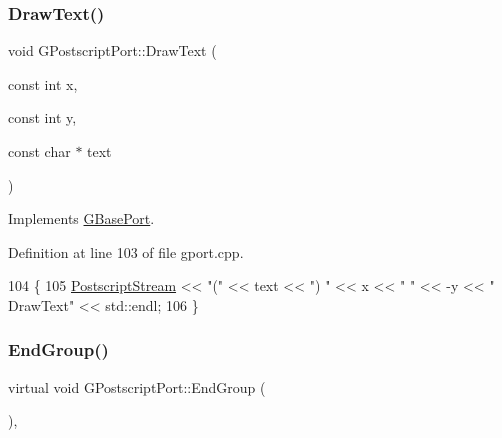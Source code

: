 \mbox{\label{class_g_postscript_port_abdd3978e13af04f5e6db9cf28cf861a8}} 
\subsubsection{\texorpdfstring{Draw\+Text()}{DrawText()}}
{\footnotesize\ttfamily void G\+Postscript\+Port\+::\+Draw\+Text (\begin{DoxyParamCaption}\item[{const int}]{x,  }\item[{const int}]{y,  }\item[{const char $\ast$}]{text }\end{DoxyParamCaption})\hspace{0.3cm}{\ttfamily [virtual]}}



Implements \mbox{\hyperlink{class_g_base_port_a9b947d2575b05f303520fbbe7fd9e350}{G\+Base\+Port}}.



Definition at line 103 of file gport.\+cpp.


\begin{DoxyCode}
104 \{
105     \mbox{\hyperlink{class_g_postscript_port_a0fb398f1c65b3ccb0efccd509f60d20d}{PostscriptStream}}  << \textcolor{stringliteral}{"("} << text << \textcolor{stringliteral}{") "} << x << \textcolor{stringliteral}{" "} << -y << \textcolor{stringliteral}{" DrawText"} << std::endl;
106 \}
\end{DoxyCode}
\mbox{\label{class_g_postscript_port_a1b78acf751c5a4c04f5942bb8bf4ed67}} 
\subsubsection{\texorpdfstring{End\+Group()}{EndGroup()}}
{\footnotesize\ttfamily virtual void G\+Postscript\+Port\+::\+End\+Group (\begin{DoxyParamCaption}{ }\end{DoxyParamCaption})\hspace{0.3cm}{\ttfamily [inline]}, {\ttfamily [virtual]}}




